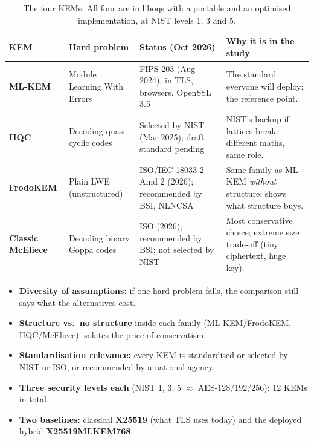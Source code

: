 \documentclass[10.5pt,a4paper]{article}
\newcommand{\key}[1]{\textbf{#1}}
\begin{document}
\begin{table}[H]
\centering\small
\begin{tabularx}{\linewidth}{@{}l>{\raggedright\arraybackslash}X>{\raggedright\arraybackslash}X>{\raggedright\arraybackslash}X@{}}
\toprule
KEM & Hard problem & Status (Oct 2026) & Why it is in the study \\
\midrule
\textcolor{fmlkem!80!black}{\textbf{ML-KEM}} & Module Learning With Errors & FIPS 203 (Aug 2024); in TLS, browsers, OpenSSL 3.5 & The standard everyone will deploy: the reference point. \\
\textcolor{fhqc!80!black}{\textbf{HQC}} & Decoding quasi-cyclic codes & Selected by NIST (Mar 2025); draft standard pending & NIST's backup if lattices break: different maths, same role. \\
\textcolor{ffrodo!80!black}{\textbf{FrodoKEM}} & Plain LWE (unstructured) & ISO/IEC 18033-2 Amd 2 (2026); recommended by BSI, NLNCSA & Same family as ML-KEM \emph{without} structure: shows what structure buys. \\
\textcolor{fmce}{\textbf{Classic McEliece}} & Decoding binary Goppa codes & ISO (2026); recommended by BSI; not selected by NIST & Most conservative choice; extreme size trade-off (tiny ciphertext, huge key). \\
\bottomrule
\end{tabularx}
\caption{The four KEMs. All four are in liboqs with a portable and an optimised implementation, at NIST levels 1, 3 and 5.}
\end{table}

\begin{takeaway}
\begin{itemize}
\item \key{Diversity of assumptions:} if one hard problem falls, the comparison still says what the alternatives cost.
\item \key{Structure vs.\ no structure} inside each family (ML-KEM/FrodoKEM, HQC/McEliece) isolates the price of conservatism.
\item \key{Standardisation relevance:} every KEM is standardised or selected by NIST or ISO, or recommended by a national agency.
\item \key{Three security levels each} (NIST 1, 3, 5 $\approx$ AES-128/192/256): 12 KEMs in total.
\item \key{Two baselines:} classical \key{X25519} (what TLS uses today) and the deployed hybrid \key{X25519MLKEM768}.
\end{itemize}
\end{takeaway}
\end{document}
